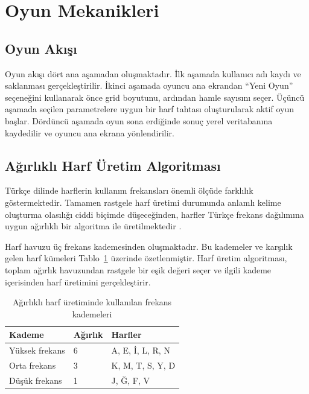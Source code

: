 \documentclass[conference]{IEEEtran}
\begin{document}
\section{Oyun Mekanikleri}

\subsection{Oyun Akışı}

Oyun akışı dört ana aşamadan oluşmaktadır. İlk aşamada kullanıcı adı kaydı ve saklanması gerçekleştirilir. İkinci aşamada oyuncu ana ekrandan ``Yeni Oyun'' seçeneğini kullanarak önce grid boyutunu, ardından hamle sayısını seçer. Üçüncü aşamada seçilen parametrelere uygun bir harf tahtası oluşturularak aktif oyun başlar. Dördüncü aşamada oyun sona erdiğinde sonuç yerel veritabanına kaydedilir ve oyuncu ana ekrana yönlendirilir.

\subsection{Ağırlıklı Harf Üretim Algoritması}

Türkçe dilinde harflerin kullanım frekansları önemli ölçüde farklılık göstermektedir. Tamamen rastgele harf üretimi durumunda anlamlı kelime oluşturma olasılığı ciddi biçimde düşeceğinden, harfler Türkçe frekans dağılımına uygun ağırlıklı bir algoritma ile üretilmektedir \cite{turkce_frekans}.

Harf havuzu üç frekans kademesinden oluşmaktadır. Bu kademeler ve karşılık gelen harf kümeleri Tablo~\ref{tab:letter-frequency-groups} üzerinde özetlenmiştir. Harf üretim algoritması, toplam ağırlık havuzundan rastgele bir eşik değeri seçer ve ilgili kademe içerisinden harf üretimini gerçekleştirir.

\begin{table}[H]
\centering
\caption{Ağırlıklı harf üretiminde kullanılan frekans kademeleri}
\label{tab:letter-frequency-groups}
\begin{tabular}{lll}
\toprule
\textbf{Kademe} & \textbf{Ağırlık} & \textbf{Harfler} \\
\midrule
Yüksek frekans & 6 & A, E, İ, L, R, N \\
Orta frekans & 3 & K, M, T, S, Y, D \\
Düşük frekans & 1 & J, Ğ, F, V \\
\bottomrule
\end{tabular}
\end{table}
\end{document}

